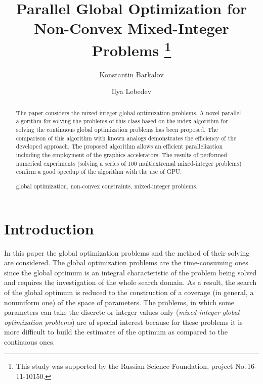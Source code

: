 \documentclass{llncs}
\begin{document}
\mainmatter 

\title{Parallel Global Optimization for Non-Convex Mixed-Integer Problems
\thanks{This study was supported by the Russian Science Foundation, 
project No.\,16-11-10150.}}
\author{Konstantin Barkalov \and Ilya Lebedev %
\\
}


\maketitle

\begin{abstract}

The paper considers the mixed-integer global optimization problems. A novel 
parallel algorithm for solving the problems of this class based on the index 
algorithm for solving the continuous global optimization problems has been proposed. 
The comparison of this algorithm with known analogs demonstrates the efficiency of the 
developed approach. 
The proposed algorithm allows an efficient parallelization including the employment of the 
graphics accelerators. The results of performed numerical experiments (solving a series of 100 multiextremal mixed-integer problems) confirm a good speedup of the algorithm with the use of GPU. 

\keywords global optimization, non-convex constraints, mixed-integer problems.

\end{abstract}

\section{Introduction}\label{sec:intro}

In this paper the global optimization problems and the method of their solving are 
considered. The global optimization problems are the time-consuming ones since the global 
optimum is an integral characteristic of the problem being solved and requires the investigation 
of the whole search domain. 
As a result, the search of the global optimum is reduced to the construction of a coverage (in 
general, a nonuniform one) of the space of parameters. 
The problems, in which some parameters can take the discrete or integer values only (\textit{mixed-integer global 
optimization problems}) are of special interest because for these problems it is more difficult to build 
the estimates of the optimum as compared to the continuous ones.
\end{document}
